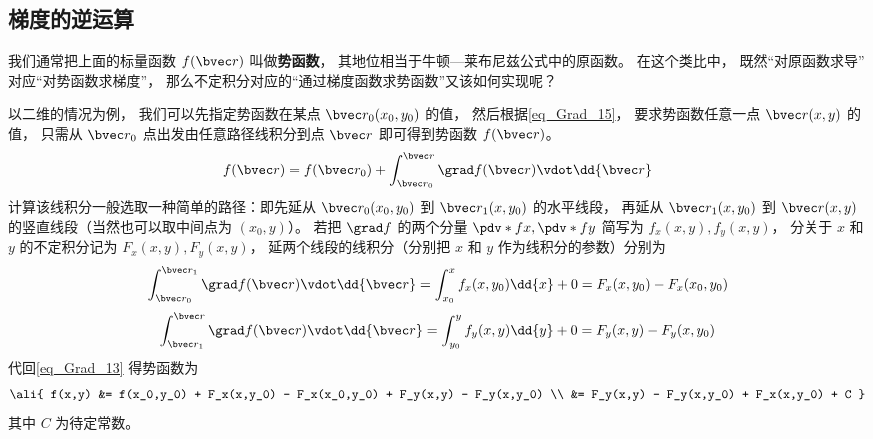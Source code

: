 \subsection{梯度的逆运算}

我们通常把上面的标量函数 $f(\bvec r)$ 叫做\textbf{势函数}， 其地位相当于牛顿—莱布尼兹公式中的原函数。 在这个类比中， 既然“对原函数求导” 对应“对势函数求梯度”， 那么不定积分对应的“通过梯度函数求势函数”又该如何实现呢？

以二维的情况为例， 我们可以先指定势函数在某点 $\bvec r_0 (x_0,y_0)$ 的值， 然后根据\autoref{eq_Grad_15}， 要求势函数任意一点 $\bvec r (x,y)$ 的值， 只需从 $\bvec r_0$ 点出发由任意路径线积分到点 $\bvec r$ 即可得到势函数 $f(\bvec r)$。
\begin{equation}\label{eq_Grad_13}
f(\bvec r) =  f(\bvec r_0) + \int_{\bvec r_0}^{\bvec r} \grad f(\bvec r) \vdot \dd{\bvec r} 
\end{equation}
计算该线积分一般选取一种简单的路径：即先延从 $\bvec r_0(x_0,y_0)$ 到 $\bvec r_1(x, y_0)$ 的水平线段， 再延从 $\bvec r_1(x, y_0)$ 到 $\bvec r(x,y)$ 的竖直线段（当然也可以取中间点为 $(x_0,y)$）。 若把 $\grad f$ 的两个分量 $\pdv*{f}{x}, \pdv*{f}{y}$ 简写为 $f_x(x,y), f_y(x,y)$， 分关于 $x$ 和 $y$ 的不定积分记为 $F_x(x,y), F_y(x,y)$， 延两个线段的线积分（分别把 $x$ 和 $y$ 作为线积分的参数）分别为
\begin{equation}
 \int_{\bvec r_0}^{\bvec r_1} \grad f(\bvec r) \vdot \dd{\bvec r} = \int_{x_0}^{x} f_x(x,y_0) \dd{x} + 0 = F_x(x,y_0) - F_x(x_0,y_0)
\end{equation}
\begin{equation}
 \int_{\bvec r_1}^{\bvec r} \grad f(\bvec r) \vdot \dd{\bvec r} = \int_{y_0}^{y} f_y(x,y) \dd{y} + 0 = F_y(x,y) - F_y(x,y_0)
\end{equation}
代回\autoref{eq_Grad_13} 得势函数为
\begin{equation}\label{eq_Grad_23}\ali{
f(x,y) &= f(x_0,y_0) + F_x(x,y_0) - F_x(x_0,y_0) + F_y(x,y) - F_y(x,y_0) \\
&= F_y(x,y) - F_y(x,y_0) + F_x(x,y_0) + C
}\end{equation}
其中 $C$ 为待定常数。
